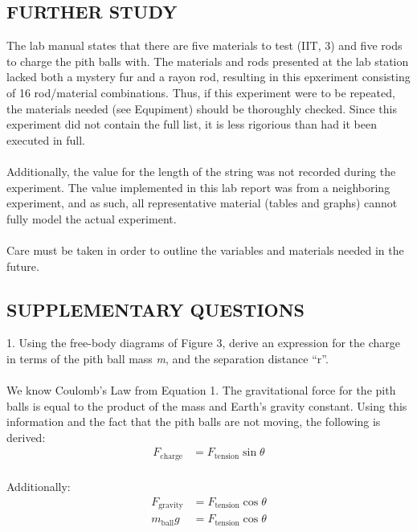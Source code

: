 \documentclass [12pt, letterpaper, twoside] {article}
\begin{document}
\subsection* {FURTHER STUDY}
The lab manual states that there are five materials to test (IIT, 3) and five rods to charge the pith balls with. The materials and rods presented at the lab station lacked both a mystery fur and a rayon rod, resulting in this epxeriment consisting of 16 rod/material combinations. Thus, if this experiment were to be repeated, the materials needed (see Equpiment) should be thoroughly checked. Since this experiment did not contain the full list, it is less rigorious than had it been executed in full. \\\\
Additionally, the value for the length of the string was not recorded during the experiment. The value implemented in this lab report was from a neighboring experiment, and as such, all representative material (tables and graphs) cannot fully model the actual experiment. \\\\
Care must be taken in order to outline the variables and materials needed in the future. 

\subsection* {SUPPLEMENTARY QUESTIONS}
1. Using the free-body diagrams of Figure 3, derive an expression for the charge in terms of the pith ball mass \emph{m}, and the separation distance “r”. \\\\
We know Coulomb's Law from Equation 1. The gravitational force for the pith balls is equal to the product of the mass and Earth's gravity constant. Using this information and the fact that the pith balls are not moving, the following is derived:
\begin{equation}
  \begin{split}
    F_{\text{charge}} &= F_{\text{tension}}\sin{\theta} \\
  \end{split}
\end{equation}

\noindent
Additionally:
\begin{equation}
  \begin{split}
    F_{\text{gravity}} &= F_{\text{tension}}\cos{\theta} \\
    m_{\text{ball}}g &= F_{\text{tension}}\cos{\theta} \\
  \end{split}
\end{equation}
\end{document}
